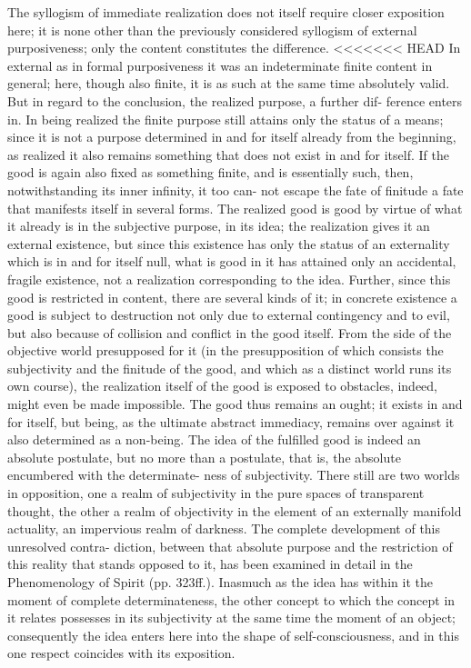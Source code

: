 The syllogism of immediate realization
does not itself require closer exposition here;
it is none other than the previously considered syllogism
of external purposiveness;
only the content constitutes the difference.
<<<<<<< HEAD
In external as in formal purposiveness it was an indeterminate finite content
in general; here, though also finite, it is as such at the same time absolutely
valid. But in regard to the conclusion, the realized purpose, a further dif-
ference enters in. In being realized the finite purpose still attains only the
status of a means; since it is not a purpose determined in and for itself
already from the beginning, as realized it also remains something that does
not exist in and for itself. If the good is again also fixed as something finite,
and is essentially such, then, notwithstanding its inner infinity, it too can-
not escape the fate of finitude
a fate that manifests itself in several forms.
The realized good is good by virtue of what it already is in the subjective
purpose, in its idea; the realization gives it an external existence, but since
this existence has only the status of an externality which is in and for itself
null, what is good in it has attained only an accidental, fragile existence,
not a realization corresponding to the idea.
Further, since this good is
restricted in content, there are several kinds of it; in concrete existence a
good is subject to destruction not only due to external contingency and
to evil, but also because of collision and conflict in the good itself. From
the side of the objective world presupposed for it (in the presupposition
of which consists the subjectivity and the finitude of the good, and which
as a distinct world runs its own course), the realization itself of the good
is exposed to obstacles, indeed, might even be made impossible. The good
thus remains an ought; it exists in and for itself, but being, as the ultimate
abstract immediacy, remains over against it also determined as a non-being.
The idea of the fulfilled good is indeed an absolute postulate, but no more
than a postulate, that is, the absolute encumbered with the determinate-
ness of subjectivity. There still are two worlds in opposition, one a realm of
subjectivity in the pure spaces of transparent thought, the other a realm of
objectivity in the element of an externally manifold actuality, an impervious
realm of darkness. The complete development of this unresolved contra-
diction, between that absolute purpose and the restriction of this reality that
stands opposed to it, has been examined in detail in the Phenomenology
of Spirit (pp. 323ff.).
Inasmuch as the idea has within it the moment
of complete determinateness, the other concept to which the concept in
it relates possesses in its subjectivity at the same time the moment of an
object; consequently the idea enters here into the shape of self-consciousness,
and in this one respect coincides with its exposition.

